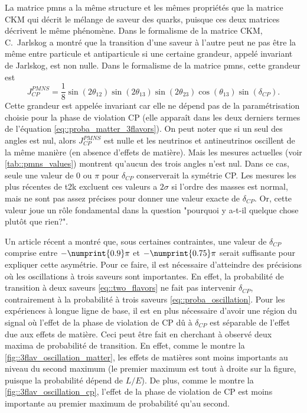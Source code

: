         La matrice \gls{pmns} a la même structure et les mêmes propriétés que la matrice CKM qui décrit le mélange de saveur des quarks, puisque ces deux matrices décrivent le même phénomène. Dans le formalisme de la matrice CKM, C.~Jarlskog a montré que la transition d'une saveur à l'autre peut ne pas être la même entre particule et antiparticule si une certaine grandeur, appelé invariant de Jarlskog, est non nulle\cite{Jarlskog1985}. Dans le formalisme de la matrice \gls{pmns}, cette grandeur est
        \begin{equation}
          J_{CP}^{PMNS}=\frac{1}{8}\sin(2\theta_{12})\sin(2\theta_{13})\sin(2\theta_{23})\cos(\theta_{13})\sin(\delta_{CP}).
        \end{equation}
        Cette grandeur est appelée invariant car elle ne dépend pas de la paramétrisation choisie pour la phase de violation CP (elle apparaît dans les deux derniers termes de l'équation \eqref{eq::proba_matter_3flavors}). On peut noter que si un seul des angles est nul, alors $J_{CP}^{PMNS}$ est nulle et les neutrinos et antineutrinos oscillent de la même manière (en absence d'effets de matière). Mais les mesures actuelles (voir \autoref{tab::pmns_values}) montrent qu'aucun des trois angles n'est nul. Dans ce cas, seule une valeur de $0$ ou $\pi$ pour $\delta_{CP}$ conserverait la symétrie CP. Les mesures les plus récentes de \gls{t2k} excluent ces valeurs a $2\sigma$\cite{Abe2018} si l'ordre des masses est normal, mais ne sont pas assez précises pour donner une valeur exacte de $\delta_{CP}$. Or, cette valeur joue un rôle fondamental dans la question "pourquoi y a-t-il quelque chose plutôt que rien?".
        
        Un article récent\cite{Buccella2018}  a montré que, sous certaines contraintes, une valeur de $\delta_{CP}$ comprise entre $-\numprint{0.9}\pi$ et $-\numprint{0.75}\pi$ serait suffisante pour expliquer cette asymétrie. Pour ce faire, il est nécessaire d'atteindre des précisions où les oscillations à trois saveurs sont importantes. En effet, la probabilité de transition à deux saveurs \eqref{eq::two_flavors} ne fait pas intervenir $\delta_{CP}$, contrairement à la probabilité à trois saveurs \eqref{eq::proba_oscillation}. Pour les expériences à longue ligne de base, il est en plus nécessaire d'avoir une région du signal où l'effet de la phase de violation de CP dû à $\delta_{CP}$ est séparable de l'effet due aux effets de matière. Ceci peut être fait en cherchant à observé deux maxima de probabilité de transition. En effet,  comme le montre la \autoref{fig::3flav_oscillation_matter}, les effets de matières sont moins importants au niveau du second maximum (le premier maximum est tout à droite sur la figure, puisque la probabilité dépend de $L/E$). De plus, comme le montre la \autoref{fig::3flav_oscillation_cp}, l'effet de la phase de violation de CP est moins importante au premier maximum de probabilité qu'au second.

